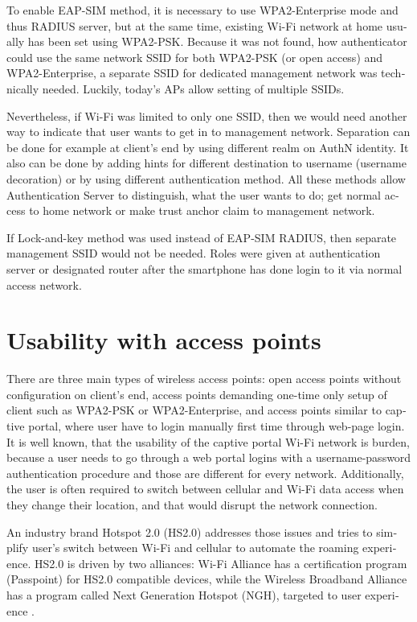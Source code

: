 \documentclass[12pt,a4paper,english]{tutthesis}
\begin{document}
\begin{otherlanguage}{english}
To enable EAP-SIM method, it is necessary to use WPA2-Enterprise mode
and thus RADIUS server, but at the same time, existing Wi-Fi network at
home usually has been set using WPA2-PSK.
Because it was not found, how authenticator could use the same network
SSID for both WPA2-PSK (or open access) and WPA2-Enterprise, a
separate SSID for dedicated management network was technically needed.
Luckily, today's APs allow setting of multiple SSIDs.

Nevertheless, if Wi-Fi was limited to only one SSID, then we would
need another 
way to indicate that user wants to get in to management network. 
Separation can be done for example at client's  end by using different realm on
AuthN identity. It also can be done by adding hints for different destination to
username (username decoration) or by using different authentication
method. All these methods allow Authentication Server to distinguish, what the user
wants to do; get normal access to home network or make trust anchor claim to 
management network.

If Lock-and-key method was used instead of EAP-SIM RADIUS, then
separate manage\-ment SSID would not be needed. Roles were given at
authentication server or designated router after the smartphone has done login to it
via normal access network.


\section{Usability with access points}
\label{sec-6-4}
There are three main types of wireless access points: open access
points without configuration on client's end, access points 
demanding one-time only setup of client such as WPA2-PSK or
WPA2-Enterprise, and access points similar to captive portal, where
user have to login manually first time through web-page login.
It is well known, that the usability of the captive portal Wi-Fi
 network is burden, because a user needs to go through 
a web portal logins with a username-password authentication 
procedure and those are different for every network.
Additionally, the user is often required to switch 
between cellular and  Wi-Fi data access when they change their
 location, and that would disrupt the network connection.

An industry brand  Hotspot 2.0 (HS2.0) addresses those issues and tries to
simplify user's switch between Wi-Fi and cellular to automate the
roaming experience.  HS2.0 is driven by two alliances:
Wi-Fi Alliance has a certification program (Passpoint)
for HS2.0 compatible devices, while the Wireless Broadband
Alliance has a program called Next Generation Hotspot (NGH), targeted
to user experience \cite{wba-ngh}.


\end{otherlanguage}
\end{document}
